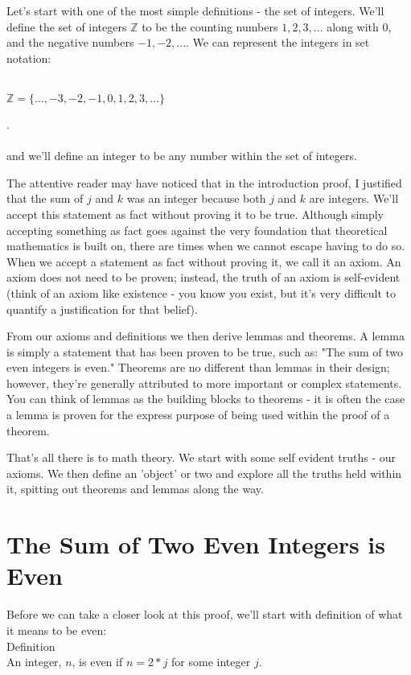 \documentclass[a4paper,12pt]{article}
\begin{document}
Let's start with one of the most simple definitions - the set of integers. We'll define the set of integers $\mathbb{Z}$ to be the counting numbers $1, 2, 3, ...$ along with $0$, and the negative numbers ${-1}, {-2}, ...$. We can represent the integers in set notation: \\
\\
\centerline{$\mathbb{Z} = \{ ..., {-3}, {-2}, {-1}, 0, 1, 2, 3, ... \}$}. \\
\\
and we'll define an integer to be any number within the set of integers.

The attentive reader may have noticed that in the introduction proof, I justified that the sum of $j$ and $k$ was an integer because both $j$ and $k$ are integers. We'll accept this statement as fact without proving it to be true. Although simply accepting something as fact goes against the very foundation that theoretical mathematics is built on, there are times when we cannot escape having to do so. When we accept a statement as fact without proving it, we call it an axiom. An axiom does not need to be proven; instead, the truth of an axiom is self-evident (think of an axiom like existence - you know you exist, but it's very difficult to quantify a justification for that belief). 

From our axioms and definitions we then derive lemmas and theorems. A lemma is simply a statement that has been proven to be true, such as: "The sum of two even integers is even." Theorems are no different than lemmas in their design; however, they're generally attributed to more important or complex statements. You can think of lemmas as the building blocks to theorems - it is often the case a lemma is proven for the express purpose of being used within the proof of a theorem. 

That's all there is to math theory. We start with some self evident truths - our axioms. We then define an 'object' or two and explore all the truths held within it, spitting out theorems and lemmas along the way. 

\section{The Sum of Two Even Integers is Even}
Before we can take a closer look at this proof, we'll start with definition of what it means to be even: \\

Definition \\
An integer, $n$, is even if $n = 2*j$ for some integer $j$. \\
\end{document}
